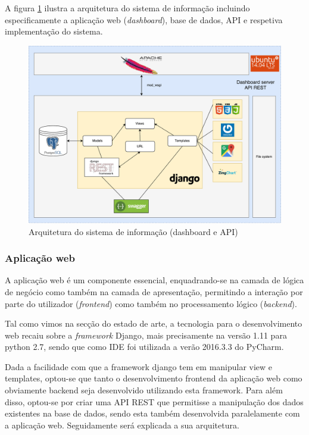 A figura \ref{arquiteturasi} ilustra a arquitetura do sistema de informação incluindo especificamente a aplicação web (\textit{dashboard}), base de dados, \acs{API}   e respetiva implementação do sistema. 


\begin{figure}[h]
	\centering
	\includegraphics[width=\linewidth]{esquemas/fisica-si.pdf}
	\caption{Arquitetura do sistema de informação (dashboard e API)}
	\label{arquiteturasi}
\end{figure}


\subsubsection{Aplicação web}

A aplicação web é um componente essencial, enquadrando-se na camada de lógica de negócio como também na camada de apresentação, permitindo a interação por parte do utilizador (\textit{frontend}) como também no processamento lógico (\textit{backend}).   

Tal como vimos na secção do estado de arte, a tecnologia para o desenvolvimento web recaiu sobre a \textit{framework} Django, mais precisamente na versão 1.11 para python 2.7, sendo que como \ac{IDE} foi utilizada a verão 2016.3.3 do PyCharm.

Dada a facilidade com que a framework django tem em manipular view e templates, optou-se que tanto o desenvolvimento frontend da aplicação web como obviamente backend seja desenvolvido utilizando esta framework. Para além disso, optou-se por criar uma API REST que permitisse a manipulação dos dados existentes na base de dados, sendo esta também desenvolvida paralelamente com a aplicação web. Seguidamente será explicada a sua arquitetura.   

